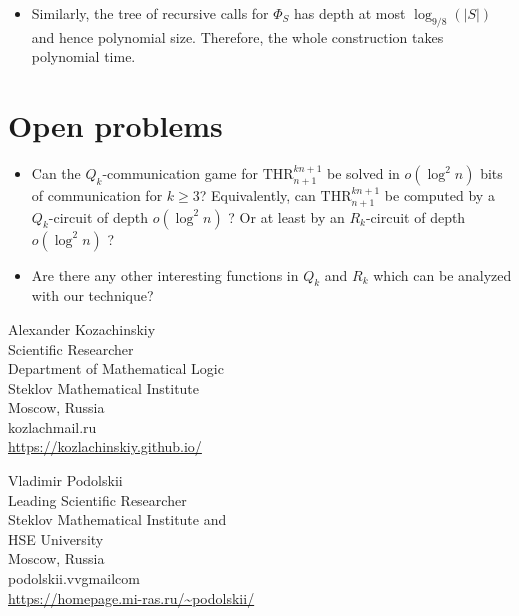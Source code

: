 \documentclass{toc}
\def\THR{\mathrm{THR}}
\begin{document}
\begin{itemize}
\item Similarly, the tree of recursive calls for $\Phi_S$ has depth at most $\log_{9/8}(|S|)$ and hence polynomial size. Therefore, the whole construction takes polynomial time.
\end{itemize}


\section{Open problems} \label{sec:open_prob}

\begin{itemize}
\item Can the $Q_k$-communication game for $\THR^{kn + 1}_{n + 1}$ be solved in $o(\log^2 n)$ bits of communication for $k\ge 3$? Equivalently, can $\THR^{kn + 1}_{n + 1}$ be computed by 
%
a $Q_k$-circuit of depth $o(\log^2 n)$ ?  %
Or at least by %
an $R_k$-circuit of depth $o(\log^2 n)$ ?  %

\item Are there any other interesting functions in $Q_k$ and $R_k$ which can be analyzed with our technique?
\end{itemize}


%
%
%
%


%
%
%
%
%
\begin{tocauthors}
\begin{tocinfo}[kozachinskiy]
 Alexander Kozachinskiy\\
 Scientific Researcher\\
 Department of Mathematical Logic\\
 Steklov Mathematical Institute\\
 Moscow, Russia\\
 kozlach\tocat{}mail.ru\\   %
 \url{https://kozlachinskiy.github.io/}      %
\end{tocinfo}
\begin{tocinfo}[podolskii]
  Vladimir Podolskii\\
  Leading Scientific Researcher\\
  Steklov Mathematical Institute and\\
  \quad HSE University\\
  Moscow, Russia\\
  podolskii.vv\tocat{}gmail\tocdot{}com \\
  \url{https://homepage.mi-ras.ru/~podolskii/}
\end{tocinfo}
\end{tocauthors}
\end{document}
